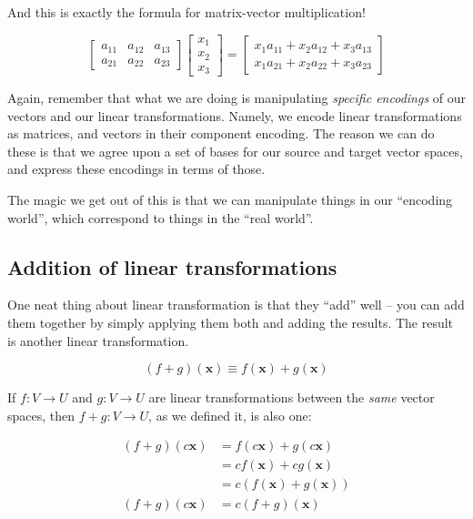 \documentclass[]{article}
\begin{document}
And this is exactly the formula for matrix-vector multiplication!

\[
\begin{bmatrix}
a_{11} & a_{12} & a_{13} \\
a_{21} & a_{22} & a_{23}
\end{bmatrix}
\begin{bmatrix}
x_1 \\
x_2 \\
x_3
\end{bmatrix}
=
\begin{bmatrix}
x_1 a_{11} + x_2 a_{12} + x_3 a_{13} \\
x_1 a_{21} + x_2 a_{22} + x_3 a_{23}
\end{bmatrix}
\]

Again, remember that what we are doing is manipulating \emph{specific encodings}
of our vectors and our linear transformations. Namely, we encode linear
transformations as matrices, and vectors in their component encoding. The reason
we can do these is that we agree upon a set of bases for our source and target
vector spaces, and express these encodings in terms of those.

The magic we get out of this is that we can manipulate things in our ``encoding
world'', which correspond to things in the ``real world''.

\subsection{Addition of linear
transformations}\label{addition-of-linear-transformations}

One neat thing about linear transformation is that they ``add'' well -- you can
add them together by simply applying them both and adding the results. The
result is another linear transformation.

\[
(f + g)(\mathbf{x}) \equiv f(\mathbf{x}) + g(\mathbf{x})
\]

If \(f : V \rightarrow U\) and \(g : V \rightarrow U\) are linear
transformations between the \emph{same} vector spaces, then
\(f + g : V \rightarrow U\), as we defined it, is also one:

\[
\begin{aligned}
(f + g)(c \mathbf{x}) & = f(c \mathbf{x}) + g(c \mathbf{x}) \\
                      & = c f(\mathbf{x}) + c g(\mathbf{x}) \\
                      & = c ( f(\mathbf{x}) + g(\mathbf{x}) ) \\
(f + g)(c \mathbf{x}) & = c (f + g)(\mathbf{x})
\end{aligned}
\]
\end{document}
